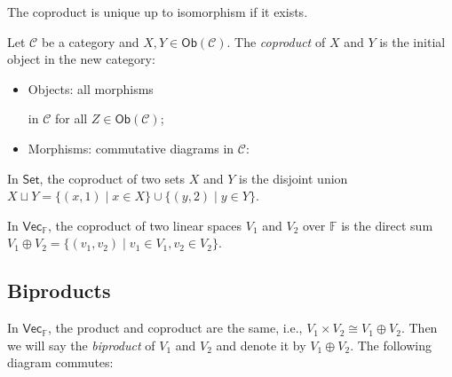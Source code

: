 \documentclass[
	11pt, %
	fleqn, %
	a4paper, %
]{LegrandOrangeBook}
\newcommand{\F}{\mathbb{F}} %
\newcommand{\C}{\mathcal{C}} %
\newcommand{\Set}{\boldsymbol{\mathsf{Set}}} %
\newcommand{\Vect}{\boldsymbol{\mathsf{Vec}}} %
\newcommand{\Ob}[1]{\mathsf{Ob}(#1)} %
\begin{document}
\begin{remark}
    The coproduct is unique up to isomorphism if it exists.
\end{remark}

\begin{corollary}
    Let $\C$ be a category and $X, Y \in \Ob{\C}$. The \emph{coproduct} of $X$ and $Y$ is the initial object in the new category:
    \begin{itemize}
        \item Objects: all morphisms  in $\C$ for all $Z \in \Ob{\C}$;
        \item Morphisms: commutative diagrams in $\C$:
    \end{itemize}
    \begin{center}
    \end{center}
\end{corollary}

\begin{example}
    In $\Set$, the coproduct of two sets $X$ and $Y$ is the disjoint union $X \sqcup Y = \{ (x, 1) \mid x \in X \} \cup \{ (y, 2) \mid y \in Y \}$.
\end{example}

\begin{example}
    In $\Vect_{\F}$, the coproduct of two linear spaces $V_1$ and $V_2$ over $\F$ is the direct sum $V_1 \oplus V_2 = \{ (v_1, v_2) \mid v_1 \in V_1, v_2 \in V_2 \}$.
\end{example}

\subsection{Biproducts}

In $\Vect_{\F}$, the product and coproduct are the same, i.e., $V_1 \times V_2 \cong V_1 \oplus V_2$. Then we will say the \emph{biproduct} of $V_1$ and $V_2$ and denote it by $V_1 \oplus V_2$. The following diagram commutes:
\begin{center}
\end{center}
\end{document}
